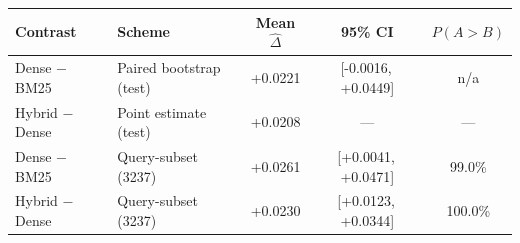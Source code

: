 \begin{tabular}{llSSc}
\toprule
\textbf{Contrast} & \textbf{Scheme} & \textbf{Mean $\hat{\Delta}$} & \textbf{95\% CI} & $P(A{>}B)$ \\
\midrule
Dense $-$ BM25 & Paired bootstrap (test) & +0.0221 & {[-0.0016,\, +0.0449]} & n/a \\
Hybrid $-$ Dense & Point estimate (test) & +0.0208 & {---} & --- \\
Dense $-$ BM25 & Query-subset (3237) & +0.0261 & {[+0.0041,\, +0.0471]} & 99.0\% \\
Hybrid $-$ Dense & Query-subset (3237) & +0.0230 & {[+0.0123,\, +0.0344]} & 100.0\% \\
\bottomrule
\end{tabular}

